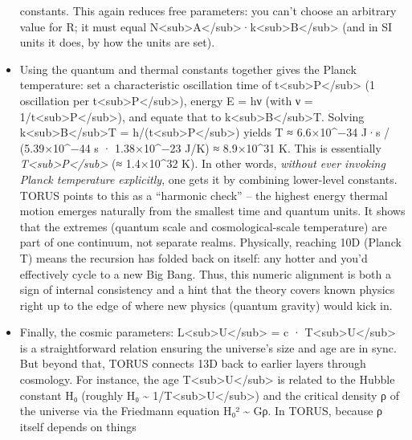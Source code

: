\begin{itemize}
  constants​. This again reduces free parameters: you can't choose an
  arbitrary value for R; it must equal
  N\textless{}sub\textgreater{}A\textless{}/sub\textgreater{}·k\textless{}sub\textgreater{}B\textless{}/sub\textgreater{}
  (and in SI units it does, by how the units are set).
\item
  Using the quantum and thermal constants together gives the Planck
  temperature: set a characteristic oscillation time of
  t\textless{}sub\textgreater{}P\textless{}/sub\textgreater{} (1
  oscillation per
  t\textless{}sub\textgreater{}P\textless{}/sub\textgreater{}), energy E
  = hν (with ν =
  1/t\textless{}sub\textgreater{}P\textless{}/sub\textgreater{}), and
  equate that to
  k\textless{}sub\textgreater{}B\textless{}/sub\textgreater{}T. Solving
  k\textless{}sub\textgreater{}B\textless{}/sub\textgreater{}T =
  h/(t\textless{}sub\textgreater{}P\textless{}/sub\textgreater{}) yields
  T ≈ 6.6×10\^{}−34 J·s / (5.39×10\^{}−44 s · 1.38×10\^{}−23 J/K) ≈
  8.9×10\^{}31 K​. This is essentially
  \emph{T\textless{}sub\textgreater{}P\textless{}/sub\textgreater{}} (≈
  1.4×10\^{}32 K)​. In other words, \emph{without ever invoking Planck
  temperature explicitly}, one gets it by combining lower-level
  constants. TORUS points to this as a ``harmonic check'' -- the highest
  energy thermal motion emerges naturally from the smallest time and
  quantum units​. It shows that the extremes (quantum scale and
  cosmological-scale temperature) are part of one continuum, not
  separate realms. Physically, reaching 10D (Planck T) means the
  recursion has folded back on itself: any hotter and you'd effectively
  cycle to a new Big Bang. Thus, this numeric alignment is both a sign
  of internal consistency and a hint that the theory covers known
  physics right up to the edge of where new physics (quantum gravity)
  would kick in.
\item
  Finally, the cosmic parameters:
  L\textless{}sub\textgreater{}U\textless{}/sub\textgreater{} = c ·
  T\textless{}sub\textgreater{}U\textless{}/sub\textgreater{} is a
  straightforward relation ensuring the universe's size and age are in
  sync​. But beyond that, TORUS connects 13D back to earlier layers
  through cosmology. For instance, the age
  T\textless{}sub\textgreater{}U\textless{}/sub\textgreater{} is related
  to the Hubble constant H₀ (roughly H₀ \textasciitilde{}
  1/T\textless{}sub\textgreater{}U\textless{}/sub\textgreater{}) and the
  critical density ρ of the universe via the Friedmann equation H₀²
  \textasciitilde{} Gρ​. In TORUS, because ρ itself depends on things

\end{itemize}
